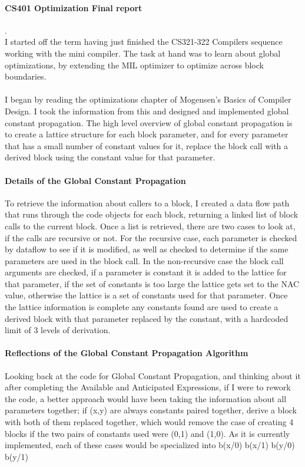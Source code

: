 \documentclass[14pt]{article}
\author{Joel Anna<annajoel@pdx.edu>}
\begin{document}
\paragraph{CS401 Optimization Final report} 
.\\
I started off the term having just finished the CS321-322 Compilers sequence working with the mini compiler. The task at hand was to learn about global optimizations, by extending the MIL optimizer to optimize across block boundaries.
\paragraph{}
I began by reading the optimizations chapter of Mogensen's Basics of Compiler Design. I took the information from this and designed and implemented global constant propagation. The high level overview of global constant propagation is to create a lattice structure for each block parameter, and for every parameter that has a small number of constant values for it, replace the block call with a derived block using the constant value for that parameter.\\
\paragraph{Details of the Global Constant Propagation}
To retrieve the information about callers to a block, I created a data flow path that runs through the code objects for each block, returning a linked list of block calls to the current block. Once a list is retrieved, there are two cases to look at, if the calls are recursive or not. For the recursive case, each parameter is checked by dataflow to see if it is modified, as well as checked to determine if the same parameters are used in the block call. In the non-recursive case the block call arguments are checked, if a parameter is constant it is added to the lattice for that parameter, if the set of constants is too large the lattice gets set to the NAC value, otherwise the lattice is a set of constants used for that parameter.
Once the lattice information is complete any constants found are used to create a derived block with that parameter replaced by the constant, with a hardcoded limit of 3 levels of derivation.\\
\paragraph{Reflections of the Global Constant Propagation Algorithm} Looking back at the code for Global Constant Propagation, and thinking about it after completing the Available and Anticipated Expressions, if I were to rework the code, a better approach would have been taking the information about all parameters together; if (x,y) are always constants paired together, derive a block with both of them replaced together, which would remove the case of creating 4 blocks if the two pairs of constants used were (0,1) and (1,0). As it is currently implemented, each of these cases would be specialized into b(x/0) b(x/1) b(y/0) b(y/1)
\end{document}
